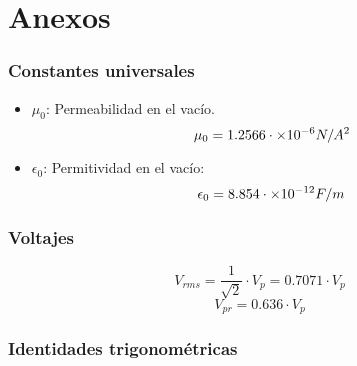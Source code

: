 \documentclass[
	12pt, %
	fleqn, %
	a4paper, %
	oneside, %
]{LegrandOrangeBook}
\begin{document}
\part{Anexos}
\section{Constantes universales}
\begin{itemize}
\item $\mu_0$: Permeabilidad en el vacío.
\begin{displaymath}
\mu_0=1.2566\cdot\times 10^{-6} N/A^2
\end{displaymath}
\item $\epsilon_0$: Permitividad en el vacío:
\begin{displaymath}
\epsilon_0=8.854\cdot\times 10^{-12} F/m
\end{displaymath}
\end{itemize}
\section{Voltajes}
\begin{center}
\end{center}
\begin{equation}
V_{rms}=\frac{1}{\sqrt{2}}\cdot V_p=0.7071\cdot V_p
\label{eq:vrms}
\end{equation}
\begin{equation}
V_{pr}=0.636\cdot V_p
\label{eq:vprom}
\end{equation}
\section{Identidades trigonométricas}
\end{document}
